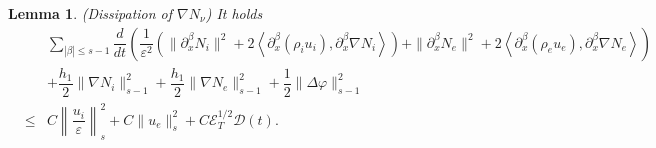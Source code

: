 \documentclass[reqno,twoside,12pt,a4paper]{amsart}
\newcommand{\eps}{\mathbb{\varepsilon}}
\newcommand{\pa}{\partial}
\newcommand{\vp}{\varphi}
\newcommand{\cubic}{C\mathscr{E}_T^{1/2}\mathscr{D}(t)}
\newtheorem{lemma}{Lemma}[section]
\numberwithin{equation}{section}
\begin{document}
\begin{lemma}\label{lemmadisestim}(Dissipation of $\nabla N_\nu$) It holds
\begin{eqnarray}\label{disestim}
&\,&\sum_{|\beta|\leq s-1}\dfrac{d}{dt}\left(\dfrac{1}{\eps^2}\left( \|\pa_x^\beta N_i\|^2+2\left<\pa_x^\beta (\rho_i u_i), \pa_x^\beta \nabla N_i \right>\right)+\|\pa_x^\beta N_e\|^2+2\left<\pa_x^\beta (\rho_e u_e), \pa_x^\beta \nabla N_e \right>\right)\nonumber\\
&\,&+\dfrac{h_1}{2}\|\nabla N_i\|_{s-1}^2+\dfrac{h_1}{2}\|\nabla N_e\|_{s-1}^2+\dfrac{1}{2}\|\Delta \vp\|_{s-1}^2\nonumber\\
&\leq &C\left\|\dfrac{u_i}{\eps}\right\|_s^2+C\|u_e\|_s^2+\cubic.
\end{eqnarray}

\end{lemma}
\end{document}
